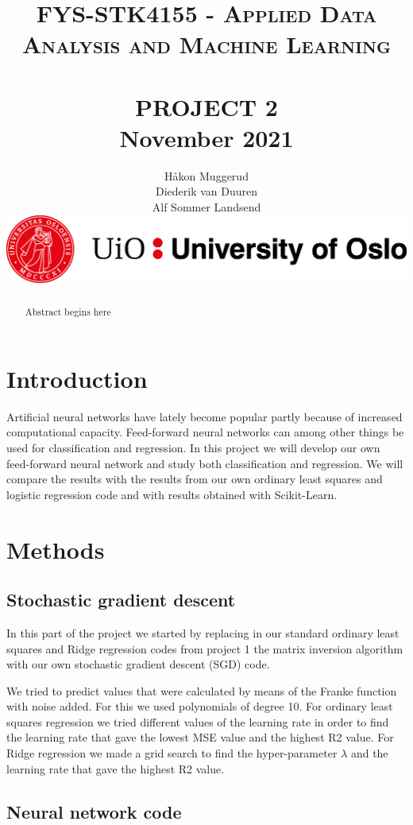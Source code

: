 \documentclass[12pt,a4paper]{article}
\title{	\normalsize \textsc{FYS-STK4155 - Applied Data Analysis and Machine Learning} 	%
		 	\\[2.0cm]								%
			\HRule{2pt} \\	[0.5cm]				%
			\LARGE \textbf{\uppercase{Project 2}}	%
			\HRule{2pt} \\ [0.5cm]		%
         \normalsize November 2021 \\
		}
\author{
		Håkon Muggerud\\
		Diederik van Duuren \\
		Alf Sommer Landsend
      \begin{center}       
         \includegraphics[width=\textwidth]{UiO.png}
      \end{center}
}
\makeatletter
\def\printtitle{%
   {\centering \@title\par}}
\def\printauthor{%
   {\centering \large \@author}}
\makeatother
\begin{document}
\thispagestyle{empty}		%

\printtitle					%
  	\vfill
\printauthor				%
\newpage

\begin{abstract}
    Abstract begins here
\end{abstract}

\tableofcontents
\thispagestyle{empty}
\newpage


\section{Introduction}
Artificial neural networks have lately become popular partly because of increased computational capacity. Feed-forward neural networks can among other things \cite{jain1996} be used for classification and regression. In this project we will develop our own feed-forward neural network and study both classification and regression. We will compare the results with the results from our own ordinary least squares and logistic regression code and with results obtained with Scikit-Learn.


\section{Methods}

    \subsection{Stochastic gradient descent}

    In this part of the project we started by replacing in our standard ordinary least squares and Ridge regression codes from project 1 the matrix inversion algorithm with our own stochastic gradient descent (SGD) code.


    We tried to predict values that were calculated by means of the Franke function with noise added. For this we used polynomials of degree 10. For ordinary least squares regression we tried different values of the learning rate in order to find the learning rate that gave the lowest MSE value and the highest R2 value. For Ridge regression we made a grid search to find the hyper-parameter $\lambda$ and the learning rate that gave the highest R2 value.
    
    \subsection{Neural network code}
    
\end{document}
